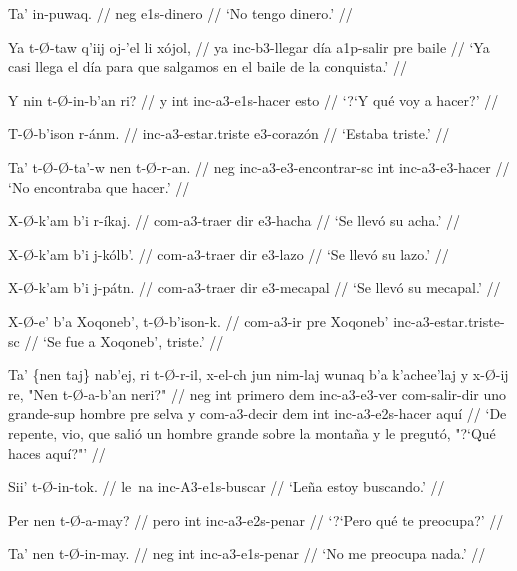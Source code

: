 \documentclass[12pt]{article}
\begin{document}
\ex
\begingl
  \gla Ta' in-puwaq. //
  \glb neg e1s-dinero //
  \glft `No tengo dinero.' //
\endgl
\xe

\ex
\begingl
  \gla Ya t-\O-taw q'iij oj-'el li x\'ojol, //
  \glb ya inc-b3-llegar d\'ia a1p-salir pre baile //
  \glft `Ya casi llega el d\'ia para que salgamos en el baile de la conquista.' //
\endgl
\xe

\ex
\begingl
  \gla  Y nin t-\O-in-b'an ri? //
  \glb  y int inc-a3-e1s-hacer esto //
  \glft `?`Y qu\'e voy a hacer?' //
\endgl
\xe

\ex
\begingl
  \gla  T-\O-b'ison r-\'anm. //
  \glb inc-a3-estar.triste e3-coraz\'on //
  \glft `Estaba triste.' //
\endgl
\xe

\ex
\begingl
  \gla  Ta' t-\O-\O-ta'-w nen t-\O-r-an. //
  \glb  neg inc-a3-e3-encontrar-sc int inc-a3-e3-hacer //
  \glft `No encontraba que hacer.' //
\endgl
\xe

\ex
\begingl
  \gla  X-\O-k'am b'i r-\'ikaj. //
  \glb com-a3-traer dir e3-hacha //
  \glft `Se llev\'o su acha.' //
\endgl
\xe

\ex
\begingl
  \gla  X-\O-k'am b'i j-k\'olb'. //
  \glb  com-a3-traer dir e3-lazo //
  \glft `Se llev\'o su lazo.' //
\endgl
\xe

\ex
\begingl
  \gla  X-\O-k'am b'i j-p\'atn. //
  \glb com-a3-traer dir e3-mecapal //
  \glft `Se llev\'o su mecapal.' //
\endgl
\xe

\ex
\begingl
  \gla  X-\O-e' b'a Xoqoneb', t-\O-b'ison-k. //
  \glb com-a3-ir pre Xoqoneb' inc-a3-estar.triste-sc //
  \glft `Se fue a Xoqoneb', triste.' //
\endgl
\xe

\ex
\begingl
  \gla  Ta' \{nen taj\} nab'ej, ri t-\O-r-il, x-el-ch jun nim-laj wunaq b'a k'achee'laj y x-\O-ij re, "Nen t-\O-a-b'an neri?" //
  \glb  neg int primero dem inc-a3-e3-ver com-salir-dir uno grande-sup hombre pre selva y com-a3-decir dem int inc-a3-e2s-hacer aqu\'i //
  \glft `De repente, vio, que sali\'o un hombre grande sobre la monta\~na y le pregut\'o, "?`Qu\'e haces aqu\'i?"' //
\endgl
\xe

\ex
\begingl
  \gla  Sii' t-\O-in-tok. //
  \glb le~na inc-A3-e1s-buscar //
  \glft `Le\~na estoy buscando.' //
\endgl
\xe

\ex
\begingl
  \gla  Per nen t-\O-a-may? //
  \glb pero int inc-a3-e2s-penar //
  \glft `?`Pero qu\'e te preocupa?' //
\endgl
\xe

\ex
\begingl
  \gla  Ta' nen t-\O-in-may. //
  \glb neg int inc-a3-e1s-penar //
  \glft `No me preocupa nada.' //
\endgl
\xe
\end{document}
